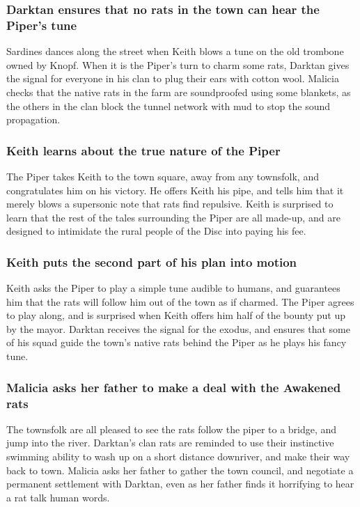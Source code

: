 \subsubsection{\Gls{Darktan} ensures that no rats in the town can hear the \Gls{Piper}'s tune}
\Gls{Sardines} dances along the street when \Gls{Keith} blows a tune on the old trombone owned by
\Gls{Knopf}. When it is the \Gls{Piper}'s turn to charm some rats, \Gls{Darktan} gives the signal
for everyone in his clan to plug their ears with cotton wool. \Gls{Malicia} checks that the native
rats in the farm are soundproofed using some blankets, as the others in the clan block the tunnel
network with mud to stop the sound propagation.

\subsubsection{\Gls{Keith} learns about the true nature of the \Gls{Piper}}
The \Gls{Piper} takes \Gls{Keith} to the town square, away from any townsfolk, and congratulates him
on his victory. He offers \Gls{Keith} his pipe, and tells him that it merely blows a supersonic
note that rats find repulsive. \Gls{Keith} is surprised to learn that the rest of the tales
surrounding the \Gls{Piper} are all made-up, and are designed to intimidate the rural people of the
Disc into paying his fee.

\subsubsection{\Gls{Keith} puts the second part of his plan into motion}
\Gls{Keith} asks the \Gls{Piper} to play a simple tune audible to humans, and guarantees him that
the rats will follow him out of the town as if charmed. The \Gls{Piper} agrees to play along, and is
surprised when \Gls{Keith} offers him half of the bounty put up by the mayor. \Gls{Darktan} receives
the signal for the exodus, and ensures that some of his squad guide the town's native rats behind
the \Gls{Piper} as he plays his fancy tune.

\subsubsection{\Gls{Malicia} asks her father to make a deal with the Awakened rats}
The townsfolk are all pleased to see the rats follow the piper to a bridge, and jump into the river.
\Gls{Darktan}'s clan rats are reminded to use their instinctive swimming ability to wash up on
a short distance downriver, and make their way back to town. \Gls{Malicia} asks her father to gather
the town council, and negotiate a permanent settlement with \Gls{Darktan}, even as her father finds
it horrifying to hear a rat talk human words.

